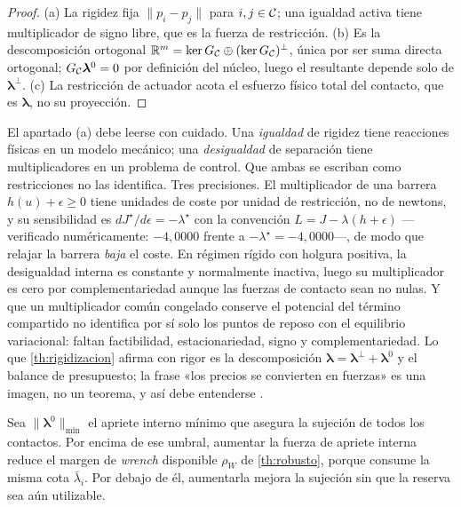 \begin{proof}
(a) La rigidez fija $\|p_i-p_j\|$ para $i,j\in\mathcal{C}$; una igualdad activa tiene
multiplicador de signo libre, que es la fuerza de restricción.
(b) Es la descomposición ortogonal $\mathbb{R}^{m}=\ker G_{\mathcal{C}}\oplus(\ker G_{\mathcal{C}})^{\perp}$,
única por ser suma directa ortogonal; $G_{\mathcal{C}}\bm\lambda^{0}=0$ por definición
del núcleo, luego el resultante depende solo de $\bm\lambda^{\perp}$.
(c) La restricción de actuador acota el esfuerzo físico total del contacto, que
es $\bm\lambda$, no su proyección.
\end{proof}

\begin{observacion}
\label{obs:precio-no-fuerza}
El apartado (a) debe leerse con cuidado. Una \emph{igualdad} de rigidez tiene
reacciones físicas en un modelo mecánico; una \emph{desigualdad} de separación
tiene multiplicadores en un problema de control. Que ambas se escriban como
restricciones no las identifica. Tres precisiones. El multiplicador de una
barrera $h(u)+\epsilon\ge0$ tiene unidades de coste por unidad de restricción,
no de newtons, y su sensibilidad es $dJ^\star/d\epsilon=-\lambda^\star$ con la
convención $L=J-\lambda(h+\epsilon)$ —verificado numéricamente: $-4{,}0000$
frente a $-\lambda^\star=-4{,}0000$—, de modo que relajar la barrera \emph{baja}
el coste. En régimen rígido con holgura positiva, la desigualdad interna es
constante y normalmente inactiva, luego su multiplicador es cero por
complementariedad aunque las fuerzas de contacto sean no nulas. Y que un
multiplicador común congelado conserve el potencial del término compartido no
identifica por sí solo los puntos de reposo con el equilibrio variacional:
faltan factibilidad, estacionariedad, signo y complementariedad. Lo que
\cref{th:rigidizacion} afirma con rigor es la descomposición
$\bm\lambda=\bm\lambda^{\perp}+\bm\lambda^{0}$ y el balance de presupuesto; la
frase «los precios se convierten en fuerzas» es una imagen, no un teorema, y así
debe entenderse \cite{mayorga2026m1}.
\end{observacion}

\begin{corolario}
\label{co:agarre}
Sea $\lVert\bm\lambda^{0}\rVert_{\min}$ el apriete interno mínimo que asegura la
sujeción de todos los contactos. Por encima de ese umbral, aumentar la fuerza de
apriete interna reduce el margen de \emph{wrench} disponible $\rho_W$ de
\cref{th:robusto}, porque consume la misma cota $\bar\lambda_i$. Por debajo de
él, aumentarla mejora la sujeción sin que la reserva sea aún utilizable.
\end{corolario}

